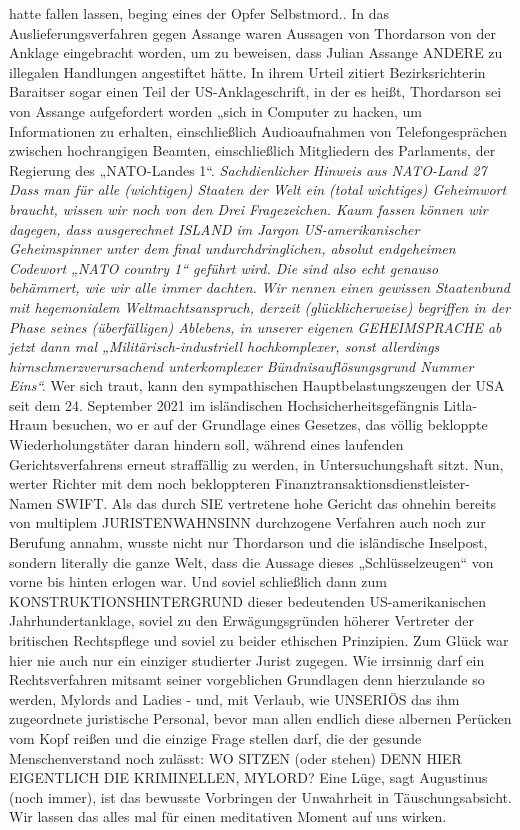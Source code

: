 \begin{multicols}{2}
{{hatte fallen lassen, beging eines der Opfer Selbstmord.}.\textCR
In das Auslieferungsverfahren gegen Assange waren
Aussagen von Thordarson von der Anklage eingebracht
worden, um zu beweisen, dass Julian Assange ANDERE zu illegalen Handlungen angestiftet hätte. In ihrem
Urteil zitiert Bezirksrichterin Baraitser sogar einen Teil
der US-Anklageschrift, in der es heißt, Thordarson sei
von Assange aufgefordert worden „sich in Computer
zu hacken, um Informationen zu erhalten, einschließlich Audioaufnahmen von Telefongesprächen zwischen
hochrangigen Beamten, einschließlich Mitgliedern des
Parlaments, der Regierung des „NATO-Landes 1“.\textCR
\textit{Sachdienlicher Hinweis aus NATO-Land 27 
Dass man für alle (wichtigen) Staaten der Welt ein (total wichtiges) Geheimwort braucht, wissen wir noch von
den Drei Fragezeichen. Kaum fassen können wir dagegen,
dass ausgerechnet ISLAND im Jargon US-amerikanischer
Geheimspinner unter dem final undurchdringlichen, absolut endgeheimen Codewort „NATO country 1“ geführt
wird. Die sind also echt genauso behämmert, wie wir alle
immer dachten.
}
\textit{
Wir nennen einen gewissen Staatenbund mit hegemonialem Weltmachtsanspruch, derzeit (glücklicherweise)
begriffen in der Phase seines (überfälligen) Ablebens, in
unserer eigenen GEHEIMSPRACHE ab jetzt dann mal
„Militärisch-industriell hochkomplexer, sonst allerdings
hirnschmerzverursachend unterkomplexer Bündnisauflösungsgrund Nummer Eins“.
}\textCR
Wer sich traut, kann den sympathischen Hauptbelastungszeugen der USA seit dem 24. September 2021 im
isländischen Hochsicherheitsgefängnis Litla-Hraun besuchen, wo er auf der Grundlage eines Gesetzes, das
völlig bekloppte Wiederholungstäter daran hindern soll,
während eines laufenden Gerichtsverfahrens erneut
straffällig zu werden, in Untersuchungshaft sitzt.\textCR
Nun, werter Richter mit dem noch bekloppteren Finanztransaktionsdienstleister-Namen SWIFT. Als das durch
SIE vertretene hohe Gericht das ohnehin bereits von
multiplem JURISTENWAHNSINN durchzogene Verfahren auch noch zur Berufung annahm, wusste nicht nur
Thordarson und die isländische Inselpost, sondern literally die ganze Welt, dass die Aussage dieses „Schlüsselzeugen“ von vorne bis hinten erlogen war.\textCR
Und soviel schließlich dann zum KONSTRUKTIONSHINTERGRUND dieser bedeutenden US-amerikanischen Jahrhundertanklage, soviel zu den Erwägungsgründen höherer Vertreter der britischen Rechtspflege
und soviel zu beider ethischen Prinzipien.\textCR
Zum Glück war hier nie auch nur ein einziger studierter Jurist zugegen. Wie irrsinnig darf ein Rechtsverfahren
mitsamt seiner vorgeblichen Grundlagen denn hierzulande so werden, Mylords and Ladies - und, mit Verlaub,
wie UNSERIÖS das ihm zugeordnete juristische Personal, bevor man allen endlich diese albernen Perücken
vom Kopf reißen und die einzige Frage stellen darf, die
der gesunde Menschenverstand noch zulässt: WO SITZEN (oder stehen) DENN HIER EIGENTLICH DIE KRIMINELLEN, MYLORD?\textCR
Eine Lüge, sagt Augustinus (noch immer), ist das bewusste Vorbringen der Unwahrheit in Täuschungsabsicht. Wir lassen das alles mal für einen meditativen Moment auf uns wirken.}



\end{multicols}
